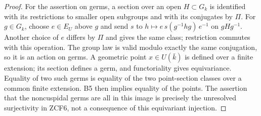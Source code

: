 \begin{proof}
For the assertion on germs, a section over an open $H\subset G_k$
is identified with its restrictions to smaller open subgroups and
with its conjugates by $\Pi$. For $g\in G_k$, choose $e\in E_U$
above $g$ and send $s$ to
$h\mapsto e\,s(g^{-1}hg)\,e^{-1}$ on $gHg^{-1}$.
Another choice of $e$ differs by $\Pi$ and gives the same class;
restriction commutes with this operation. The group law is valid
modulo exactly the same conjugation, so it is an action on germs.
A geometric point $x\in U(\bar k)$ is defined over a finite
extension; its section defines a germ, and functoriality gives
equivariance. Equality of two such germs is equality of the two
point-section classes over a common finite extension. B5 then
implies equality of the points. The assertion that the noncuspidal
germs are all in this image is precisely the unresolved surjectivity
in ZCF6, not a consequence of this equivariant injection.
\end{proof}

